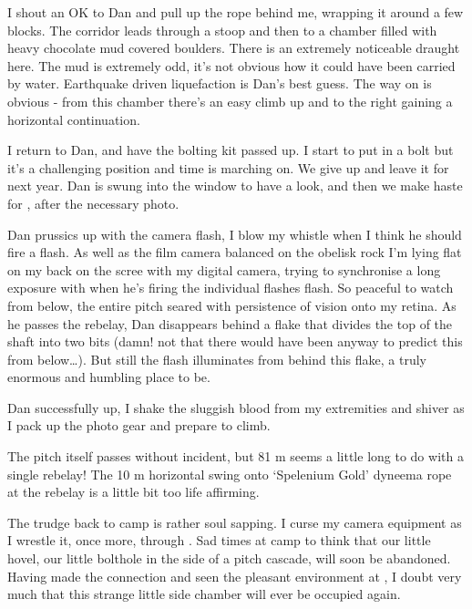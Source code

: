 I shout an OK to Dan and pull up the rope behind me, wrapping it around a
few blocks. The corridor leads through a stoop and then to a chamber
filled with heavy chocolate mud covered boulders. There is an extremely
noticeable draught here. The mud is extremely odd, it's not obvious how
it could have been carried by water. Earthquake driven liquefaction is
Dan's best guess. The way on is obvious - from this chamber there's an
easy climb up and to the right gaining a horizontal continuation.

I return to Dan, and have the bolting kit passed up. I start to put in a
bolt but it's a challenging position and time is marching on. We give up
and leave it for next year. Dan is swung into the window to have a look,
and then we make haste for , after the necessary photo.




Dan prussics up with the camera flash, I blow my whistle when I think he
should fire a flash. As well as the film camera balanced on the obelisk
rock I'm lying flat on my back on the scree with my digital camera,
trying to synchronise a long exposure with when he's firing the
individual flashes flash. So peaceful to watch from below, the entire
pitch seared with persistence of vision onto my retina. As he passes the
rebelay, Dan disappears behind a flake that divides the top of the shaft
into two bits (damn! not that there would have been anyway to predict
this from below\ldots{}). But still the flash illuminates from behind
this flake, a truly enormous and humbling place to be.

Dan successfully up, I shake the sluggish blood from my extremities and
shiver as I pack up the photo gear and prepare to climb.

The pitch itself passes without incident, but 81 m seems a little long
to do with a single rebelay! The 10 m horizontal swing onto `Spelenium
Gold' dyneema rope at the rebelay is a little bit too life affirming.

The trudge back to camp is rather soul sapping. I curse my camera
equipment as I wrestle it, once more, through . Sad
times at camp to think that our little hovel, our little bolthole in the
side of a pitch cascade, will soon be abandoned. Having made the
connection and seen the pleasant environment at , I doubt
very much that this strange little side chamber will ever be occupied
again.

